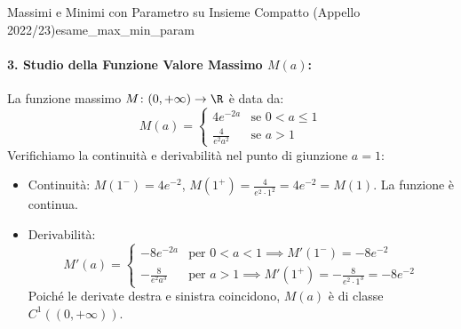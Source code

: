 \begin{esempio}{Massimi e Minimi con Parametro su Insieme Compatto (Appello 2022/23)}{esame_max_min_param}
\paragraph{3. Studio della Funzione Valore Massimo $M(a)$:}
La funzione massimo $M \colon (0, +\infty) \to \R$ è data da:
\[
    M(a) = \begin{cases}
        4e^{-2a} & \text{se } 0 < a \le 1 \\
        \frac{4}{e^2 a^2} & \text{se } a > 1
    \end{cases}
\]
Verifichiamo la continuità e derivabilità nel punto di giunzione $a = 1$:
\begin{itemize}
    \item Continuità: $M(1^-) = 4e^{-2}$, $M(1^+) = \frac{4}{e^2 \cdot 1^2} = 4e^{-2} = M(1)$. La funzione è continua.
    \item Derivabilità:
    \[
        M'(a) = \begin{cases}
            -8e^{-2a} & \text{per } 0 < a < 1 \implies M'(1^-) = -8e^{-2} \\
            -\frac{8}{e^2 a^3} & \text{per } a > 1 \implies M'(1^+) = -\frac{8}{e^2 \cdot 1^3} = -8e^{-2}
        \end{cases}
    \]
    Poiché le derivate destra e sinistra coincidono, $M(a)$ è di classe $C^1((0, +\infty))$.
\end{itemize}
\end{esempio}


